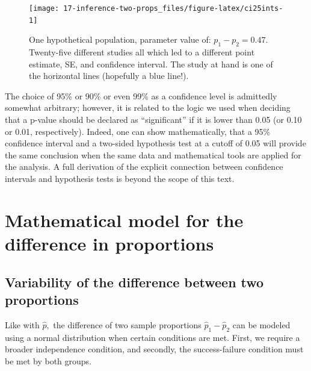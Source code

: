 \documentclass[
  10pt,
  openany]{book}
\begin{document}
\begin{figure}[h]

{\centering \texttt{[image: 17-inference-two-props\_files/figure-latex/ci25ints-1]} 

}

\caption{One hypothetical population, parameter value of: $p_1 - p_2 = 0.47.$ Twenty-five different studies all which led to a different point estimate, SE, and confidence interval.  The study at hand is one of the horizontal lines (hopefully a blue line!).}\label{fig:ci25ints}
\end{figure}

The choice of 95\% or 90\% or even 99\% as a confidence level is admittedly somewhat arbitrary; however, it is related to the logic we used when deciding that a p-value should be declared as ``significant'' if it is lower than 0.05 (or 0.10 or 0.01, respectively).
Indeed, one can show mathematically, that a 95\% confidence interval and a two-sided hypothesis test at a cutoff of 0.05 will provide the same conclusion when the same data and mathematical tools are applied for the analysis.
A full derivation of the explicit connection between confidence intervals and hypothesis tests is beyond the scope of this text.

\clearpage

\hypertarget{math-2prop}{%
\section{Mathematical model for the difference in proportions}\label{math-2prop}}

\hypertarget{variability-of-the-difference-between-two-proportions}{%
\subsection{Variability of the difference between two proportions}\label{variability-of-the-difference-between-two-proportions}}

Like with \(\hat{p},\) the difference of two sample proportions \(\hat{p}_1 - \hat{p}_2\) can be modeled using a normal distribution when certain conditions are met.
First, we require a broader independence condition, and secondly, the success-failure condition must be met by both groups.
\end{document}
